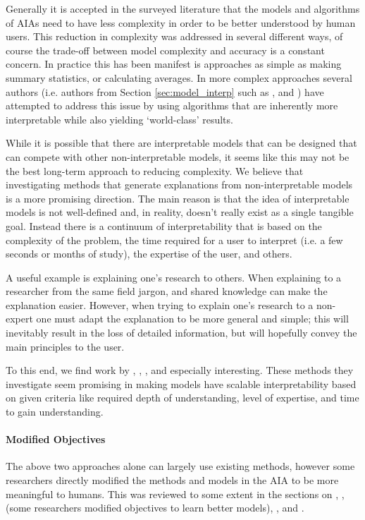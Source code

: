     Generally it is accepted in the surveyed literature that the models and algorithms of AIAs need to have less complexity in order to be better understood by human users. This reduction in complexity was addressed in several different ways, of course the trade-off between model complexity and accuracy is a constant concern. In practice this has been manifest is approaches as simple as making summary statistics, or calculating averages. In more complex approaches several authors (i.e. authors from Section \ref{sec:model_interp} such as \cite{Caruana2015-za}, and \cite{Van_Belle2012-dt}) have attempted to address this issue by using algorithms that are inherently more interpretable while also yielding `world-class' results.

    While it is possible that there are interpretable models that can be designed that can compete with other non-interpretable models, it seems like this may not be the best long-term approach to reducing complexity. We believe that investigating methods that generate explanations from non-interpretable models is a more promising direction. The main reason is that the idea of interpretable models is not well-defined and, in reality, doesn't really exist as a single tangible goal. Instead there is a continuum of interpretability that is based on the complexity of the problem, the time required for a user to interpret (i.e. a few seconds or months of study), the expertise of the user, and others.

    A useful example is explaining one's research to others. When explaining to a researcher from the same field jargon, and shared knowledge can make the explanation easier. However, when trying to explain one's research to a non-expert one must adapt the explanation to be more general and simple; this will inevitably result in the loss of detailed information, but will hopefully convey the main principles to the user.

    To this end, we find work by \cite{Ruping2006-xj}, \cite{Van_Belle2012-dt}, \cite{Ribeiro2016-uc}, and \cite{Choi2016-by} especially interesting. These methods they investigate seem promising in making models have scalable interpretability based on given criteria like required depth of understanding, level of expertise, and time to gain understanding.

    \paragraph{Modified Objectives} The above two approaches alone can largely use existing methods, however some researchers directly modified the methods and models in the AIA to be more meaningful to humans. This was reviewed to some extent in the sections on , ,  (some researchers modified objectives to learn better models), , and .

